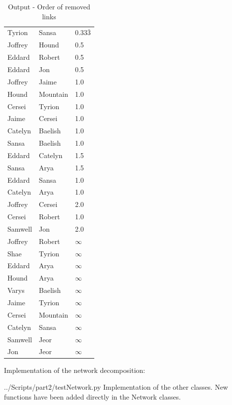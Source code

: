 \documentclass[10pt,a4paper]{article}
\begin{document}
\begin{enumerate}
	\begin{table}[H]
		\centering
		\caption{Output - Order of removed links}
		\label{table_links}
		\begin{tabular}{lll}
			Tyrion  & Sansa    & 0.33$\bar{3}$  \\
			Joffrey & Hound    & 0.5    \\
			Eddard  & Robert   & 0.5                 \\
			Eddard  & Jon      & 0.5                 \\
			Joffrey & Jaime    & 1.0                 \\
			Hound   & Mountain & 1.0                 \\
			Cersei  & Tyrion   & 1.0                 \\
			Jaime   & Cersei   & 1.0                 \\
			Catelyn & Baelish  & 1.0                 \\
			Sansa   & Baelish  & 1.0                 \\
			Eddard  & Catelyn  & 1.5                 \\
			Sansa   & Arya     & 1.5                 \\
			Eddard  & Sansa    & 1.0                 \\
			Catelyn & Arya     & 1.0                 \\
			Joffrey & Cersei   & 2.0                 \\
			Cersei  & Robert   & 1.0                 \\
			Samwell & Jon      & 2.0                 \\
			Joffrey & Robert   & $\infty$ \\
			Shae    & Tyrion   & $\infty$ \\
			Eddard  & Arya     & $\infty$ \\
			Hound   & Arya     & $\infty$ \\
			Varys   & Baelish  & $\infty$ \\
			Jaime   & Tyrion   & $\infty$ \\
			Cersei  & Mountain & $\infty$ \\
			Catelyn & Sansa    & $\infty$ \\
			Samwell & Jeor     & $\infty$ \\
			Jon     & Jeor     & $\infty$
		\end{tabular}
	\end{table}
	\newpage
	Implementation of the network decomposition:  
	
	 {../Scripts/part2/testNetwork.py}
	\newpage
	Implementation of the other classes. New functions have been added directly in the Network classes. 
	

\end{enumerate}
\end{document}
